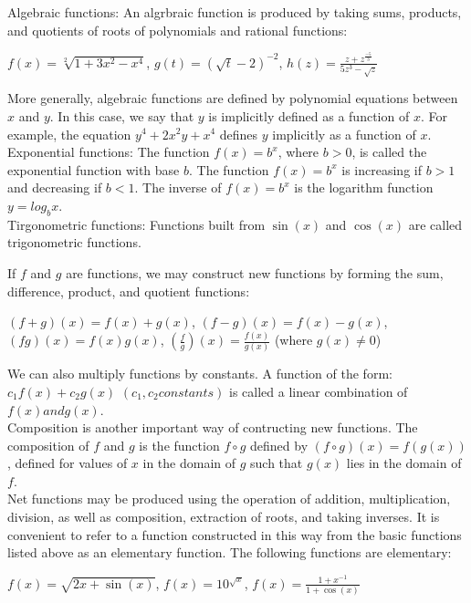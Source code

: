 \documentclass{article}
\begin{document}
Algebraic functions: An algrbraic function is produced by taking sums, products, and quotients of roots of polynomials and rational functions:\\
\begin{center} $f(x) = \sqrt[2]{1 + 3x^2 - x^4}$, $g(t) = (\sqrt{t} - 2)^{-2}$, $h(z) = \frac{z + z^{\frac{-5}{3}}}{5z^3 - \sqrt{z}}$\end{center}

More generally, algebraic functions are defined by polynomial equations between $x$ and $y$. In this case, we say that $y$ is implicitly defined as a function of $x$. For example, the equation $y^4 + 2x^{2}y + x^4$ defines $y$ implicitly as a function of $x$.\\

Exponential functions: The function $f(x) = b^x$, where $b > 0$, is called the exponential function with base $b$. The function $f(x) = b^x$ is increasing if $b > 1$ and decreasing if $b < 1$. The inverse of $f(x) = b^x$ is the logarithm function $y = log_{b}x$.\\

Tirgonometric functions: Functions built from $\sin(x)$ and $\cos(x)$ are called trigonometric functions.

If $f$ and $g$ are functions, we may construct new functions by forming the sum, difference, product, and quotient functions:\\
\begin{center} $(f + g)(x) = f(x) + g(x)$, $(f - g)(x) = f(x) - g(x)$, $(fg)(x) = f(x)g(x)$, $(\frac{f}{g})(x) = \frac{f(x)}{g(x)}$ (where $g(x) \neq 0$)\end{center}

We can also multiply functions by constants. A function of the form: $c_1f(x) + c_2g(x)$ $(c_1, c_2 constants)$ is called a linear combination of $f(x) and g(x)$.\\

Composition is another important way of contructing new functions. The composition of $f$ and $g$ is the function $f \circ g$ defined by $(f \circ g)(x) = f(g(x))$, defined for values of $x$ in the domain of $g$ such that $g(x)$ lies in the domain of $f$.\\

Net functions may be produced using the operation of addition, multiplication, division, as well as composition, extraction of roots, and taking inverses. It is convenient to refer to a function constructed in this way from the basic functions listed above as an elementary function. The following functions are elementary:\\
\begin{center} $f(x) = \sqrt{2x + \sin(x)}$, $f(x) = 10^{\sqrt{x}}$, $f(x) = \frac{1 + x^{-1}}{1 + \cos(x)}$\end{center}
\end{document}
